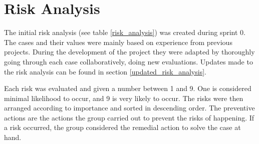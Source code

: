 \section{Risk Analysis} 
\label{riskAnalysis}
The initial risk analysis (see table \ref{risk_analysis}) was created during sprint 0. The cases and their values were mainly based on experience from previous projects. During the development of the project they were adapted by thoroughly going through each case collaboratively, doing new evaluations. Updates made to the risk analysis can be found in section \ref{updated_risk_analysis}. 

Each risk was evaluated and given a number between 1 and 9. One is considered minimal likelihood to occur, and 9 is very likely to occur. The risks were then arranged according to importance and sorted in descending order. The preventive actions are the actions the group carried out to prevent the risks of happening. If a risk occurred, the group considered the remedial action to solve the case at hand. 

